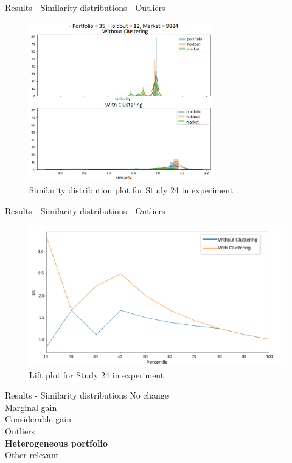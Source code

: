 
\begin{frame}{Results - Similarity distributions - Outliers}
    \begin{figure}
       \centering
       \includegraphics[width=8cm]{fig/ch4-outlier-study-24-exp-2.png}
       \caption{Similarity distribution plot for Study 24 in experiment \nameExperimentII{}.}
    \end{figure}
\end{frame}


\begin{frame}{Results - Similarity distributions - Outliers}
    \begin{figure}
       \centering
       \includegraphics[width=\linewidth]{fig/ch4-outlier-study-24-lift-exp-2.png}
       \caption{Lift plot for Study 24 in experiment \nameExperimentII{}}
    \end{figure}
\end{frame}


\begin{frame}{Results - Similarity distributions}
    No change \\ 
    \vspace{0.5cm}
    Marginal gain \\
    \vspace{0.5cm}
    Considerable gain \\
    \vspace{0.5cm}
    Outliers \\
    \vspace{0.5cm}
    \textbf{Heterogeneous portfolio} \\
    \vspace{0.5cm}
    Other relevant 
\end{frame}

